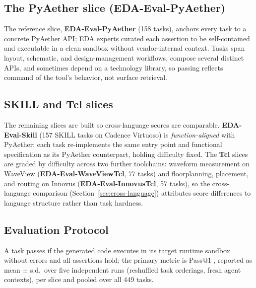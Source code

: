 \subsection{The PyAether slice (EDA-Eval-PyAether)}

The reference slice, \textbf{EDA-Eval-PyAether} (158 tasks), anchors every task to a concrete PyAether API; EDA experts curated each assertion to be self-contained and executable in a clean sandbox without vendor-internal context. Tasks span layout, schematic, and design-management workflows, compose several distinct APIs, and sometimes depend on a technology library, so passing reflects command of the tool's behavior, not surface retrieval.

\subsection{SKILL and Tcl slices}
\label{sec:benchmark-slices}

The remaining slices are built so cross-language scores are comparable. \textbf{EDA-Eval-Skill} (157 SKILL tasks on Cadence Virtuoso) is \emph{function-aligned} with PyAether: each task re-implements the same entry point and functional specification as its PyAether counterpart, holding difficulty fixed. The \textbf{Tcl} slices are graded by difficulty across two further toolchains: waveform measurement on WaveView (\textbf{EDA-Eval-WaveViewTcl}, 77 tasks) and floorplanning, placement, and routing on Innovus (\textbf{EDA-Eval-InnovusTcl}, 57 tasks), so the cross-language comparison (Section~\ref{sec:cross-language}) attributes score differences to language structure rather than task hardness.

\subsection{Evaluation Protocol}

A task passes if the generated code executes in its target runtime sandbox without errors and all assertions hold; the primary metric is Pass@1 \cite{chen2021evaluating}, reported as mean $\pm$ s.d.\ over five independent runs (reshuffled task orderings, fresh agent contexts), per slice and pooled over all 449 tasks.
